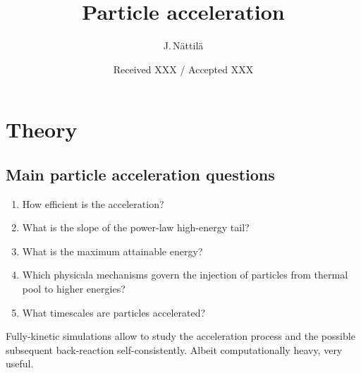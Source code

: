 \documentclass{aa}
\begin{document}
\title{Particle acceleration}

\author{J.\,N\"attil\"a}


\date{Received XXX / Accepted XXX}





\maketitle

\citep{birdsall1985}

\section{Theory}\label{sect:theory}

\subsection{Main particle acceleration questions}

\begin{enumerate}
    \item How efficient is the acceleration?
    \item What is the slope of the power-law high-energy tail?
    \item What is the maximum attainable energy?
    \item Which physicala mechanisms govern the injection of particles from thermal pool to higher energies?
    \item What timescales are particles accelerated?
\end{enumerate}

Fully-kinetic simulations allow to study the acceleration process and the possible subsequent back-reaction self-consistently.
Albeit computationally heavy, very useful.


\citep{Fermi_1949}
\citep{Fermi_1954}

\citep{Lemoine_2019}
\end{document}
